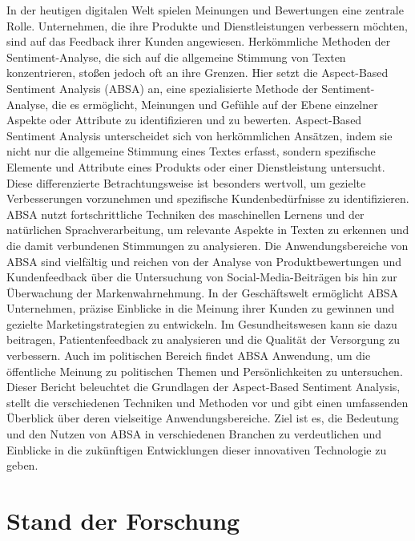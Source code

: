 \documentclass[12pt]{article}
\begin{document}
In der heutigen digitalen Welt spielen Meinungen und Bewertungen eine zentrale Rolle. Unternehmen, die ihre Produkte und Dienstleistungen verbessern 
möchten, sind auf das Feedback ihrer Kunden angewiesen. Herkömmliche Methoden der Sentiment-Analyse, die sich auf die allgemeine Stimmung von Texten
konzentrieren, stoßen jedoch oft an ihre Grenzen. Hier setzt die Aspect-Based Sentiment Analysis (ABSA) an, eine spezialisierte Methode der 
Sentiment-Analyse, die es ermöglicht, Meinungen und Gefühle auf der Ebene einzelner Aspekte oder Attribute zu identifizieren und zu bewerten.
\newline
\newline
Aspect-Based Sentiment Analysis unterscheidet sich von herkömmlichen Ansätzen, indem sie nicht nur die allgemeine Stimmung eines Textes erfasst, 
sondern spezifische Elemente und Attribute eines Produkts oder einer Dienstleistung untersucht. Diese differenzierte Betrachtungsweise ist besonders 
wertvoll, um gezielte Verbesserungen vorzunehmen und spezifische Kundenbedürfnisse zu identifizieren. ABSA nutzt fortschrittliche Techniken des 
maschinellen Lernens und der natürlichen Sprachverarbeitung, um relevante Aspekte in Texten zu erkennen und die damit verbundenen Stimmungen zu 
analysieren.
\newline
\newline
Die Anwendungsbereiche von ABSA sind vielfältig und reichen von der Analyse von Produktbewertungen und Kundenfeedback über die Untersuchung von 
Social-Media-Beiträgen bis hin zur Überwachung der Markenwahrnehmung. In der Geschäftswelt ermöglicht ABSA Unternehmen, präzise Einblicke in die 
Meinung ihrer Kunden zu gewinnen und gezielte Marketingstrategien zu entwickeln. Im Gesundheitswesen kann sie dazu beitragen, Patientenfeedback zu 
analysieren und die Qualität der Versorgung zu verbessern. Auch im politischen Bereich findet ABSA Anwendung, um die öffentliche Meinung zu politischen 
Themen und Persönlichkeiten zu untersuchen.
\newline
\newline
Dieser Bericht beleuchtet die Grundlagen der Aspect-Based Sentiment Analysis, stellt die verschiedenen Techniken und Methoden vor und gibt einen 
umfassenden Überblick über deren vielseitige Anwendungsbereiche. Ziel ist es, die Bedeutung und den Nutzen von ABSA in verschiedenen Branchen zu 
verdeutlichen und Einblicke in die zukünftigen Entwicklungen dieser innovativen Technologie zu geben.

\section{Stand der Forschung}
\end{document}
